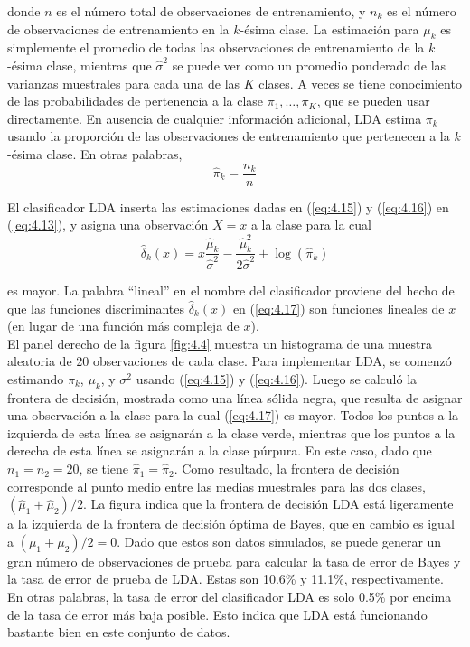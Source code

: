 \noindent donde $n$ es el número total de observaciones de entrenamiento, y $n_k$ es el número de observaciones de entrenamiento en la $k$-ésima clase. La estimación para $\mu_k$ es simplemente el promedio de todas las observaciones de entrenamiento de la $k$-ésima clase, mientras que $\hat{\sigma}^2$ se puede ver como un promedio ponderado de las varianzas muestrales para cada una de las $K$ clases. A veces se tiene conocimiento de las probabilidades de pertenencia a la clase $\pi_1, \ldots, \pi_K$, que se pueden usar directamente. En ausencia de cualquier información adicional, LDA estima $\pi_k$ usando la proporción de las observaciones de entrenamiento que pertenecen a la $k$-ésima clase. En otras palabras,
\begin{equation}
\hat{\pi}_k = \frac{n_k}{n}
\label{eq:4.16}
\end{equation}

El clasificador LDA inserta las estimaciones dadas en (\ref{eq:4.15}) y (\ref{eq:4.16}) en (\ref{eq:4.13}), y asigna una observación $X = x$ a la clase para la cual
\begin{equation}
\hat{\delta}_k(x) = x \frac{\hat{\mu}_k}{\hat{\sigma}^2} - \frac{\hat{\mu}_k^2}{2\hat{\sigma}^2} + \log(\hat{\pi}_k)
\label{eq:4.17}
\end{equation}

\noindent es mayor. La palabra ``lineal'' en el nombre del clasificador proviene del hecho de que las funciones discriminantes $\hat{\delta}_k(x)$ en (\ref{eq:4.17}) son funciones lineales de $x$ (en lugar de una función más compleja de $x$). \\

El panel derecho de la figura \ref{fig:4.4} muestra un histograma de una muestra aleatoria de 20 observaciones de cada clase. Para implementar LDA, se comenzó estimando $\pi_k$, $\mu_k$, y $\sigma^2$ usando (\ref{eq:4.15}) y (\ref{eq:4.16}). Luego se calculó la frontera de decisión, mostrada como una línea sólida negra, que resulta de asignar una observación a la clase para la cual (\ref{eq:4.17}) es mayor. Todos los puntos a la izquierda de esta línea se asignarán a la clase verde, mientras que los puntos a la derecha de esta línea se asignarán a la clase púrpura. En este caso, dado que $n_1 = n_2 = 20$, se tiene $\hat{\pi}_1 = \hat{\pi}_2$. Como resultado, la frontera de decisión corresponde al punto medio entre las medias muestrales para las dos clases, $(\hat{\mu}_1 + \hat{\mu}_2)/2$. La figura indica que la frontera de decisión LDA está ligeramente a la izquierda de la frontera de decisión óptima de Bayes, que en cambio es igual a $(\mu_1 + \mu_2)/2 = 0$. Dado que estos son datos simulados, se puede generar un gran número de observaciones de prueba para calcular la tasa de error de Bayes y la tasa de error de prueba de LDA. Estas son 10.6\% y 11.1\%, respectivamente. En otras palabras, la tasa de error del clasificador LDA es solo 0.5\% por encima de la tasa de error más baja posible. Esto indica que LDA está funcionando bastante bien en este conjunto de datos. \\

